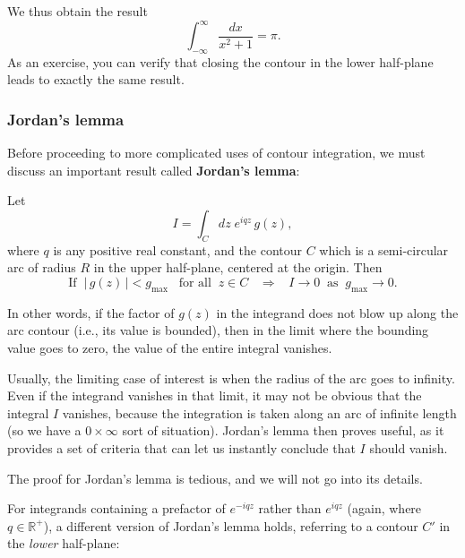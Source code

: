\documentclass[10pt,a4paper]{article}
\begin{document}
We thus obtain the result
\begin{equation}
\int_{-\infty}^\infty \frac{dx}{x^2 + 1} = \pi.
\end{equation}
As an exercise, you can verify that closing the contour in the lower
half-plane leads to exactly the same result.

\subsubsection{Jordan's lemma}
\label{jordans-lemma}

Before proceeding to more complicated uses of contour integration, we
must discuss an important result called \textbf{Jordan's lemma}:

\begin{framed}
\noindent
Let
\begin{equation}
  I = \int_C dz \; e^{iqz} \,g(z),
\end{equation}
where $q$ is any positive real constant, and the contour $C$ which is
a semi-circular arc of radius $R$ in the upper half-plane, centered at
the origin. Then
\begin{equation}
\text{If}\;\; \big|\,g(z)\,\big| < g_{\mathrm{max}} \;\;\;\text{for all}\;\;z \in C \;\;\;\Rightarrow \;\;\; I \rightarrow 0 \;\;\mathrm{as}\;\; g_{\mathrm{max}} \rightarrow 0.
\end{equation}
\end{framed}

In other words, if the factor of $g(z)$ in the integrand does not blow
up along the arc contour (i.e., its value is bounded), then in the
limit where the bounding value goes to zero, the value of the entire
integral vanishes.

Usually, the limiting case of interest is when the radius of the arc
goes to infinity. Even if the integrand vanishes in that limit, it may
not be obvious that the integral $I$ vanishes, because the integration
is taken along an arc of infinite length (so we have a $0\times\infty$
sort of situation). Jordan's lemma then proves useful, as it provides
a set of criteria that can let us instantly conclude that $I$ should
vanish.

The proof for Jordan's lemma is tedious, and we will not go into its
details.

For integrands containing a prefactor of $e^{-iqz}$ rather than
$e^{iqz}$ (again, where $q \in \mathbb{R}^+$), a different version of
Jordan's lemma holds, referring to a contour $C'$ in the \emph{lower}
half-plane:
\end{document}
